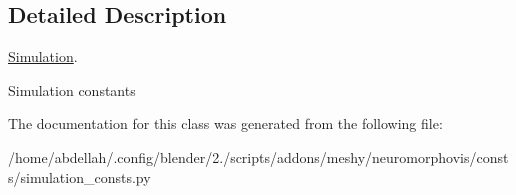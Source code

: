 \subsection{Detailed Description}
\hyperlink{classmeshy_1_1neuromorphovis_1_1consts_1_1simulation__consts_1_1Simulation}{Simulation}. 

\begin{DoxyVerb}Simulation constants
\end{DoxyVerb}
 

The documentation for this class was generated from the following file\+:\begin{DoxyCompactItemize}
\item 
/home/abdellah/.\+config/blender/2./scripts/addons/meshy/neuromorphovis/consts/simulation\+\_\+consts.\+py\end{DoxyCompactItemize}

